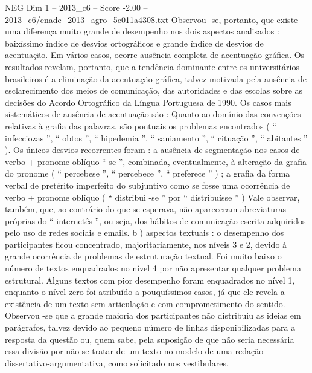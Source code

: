 \begin{textsample}{NEG Dim 1 – 2013\_c6 – Score -2.00 – 2013\_c6/enade\_2013\_agro\_5c011a4308.txt}
Observou -se, portanto, que existe uma diferença muito grande de desempenho nos dois aspectos analisados : baixíssimo índice de desvios ortográficos e grande índice de desvios de acentuação.
Em vários casos, ocorre ausência completa de acentuação gráfica.
Os resultados revelam, portanto, que a tendência dominante entre os universitários brasileiros é a eliminação da acentuação gráfica, talvez motivada pela ausência de esclarecimento dos meios de comunicação, das autoridades e das escolas sobre as decisões do Acordo Ortográfico da Língua Portuguesa de 1990.
Os casos mais sistemáticos de ausência de acentuação são : Quanto ao domínio das convenções relativas à grafia das palavras, são pontuais os problemas encontrados ( “ infecciozas ”, “ obtos ”, “ hipedemia ”, “ saniamento ”, “ cituação ”, “ abitantes ” ).
Os únicos desvios recorrentes foram : a ausência de segmentação nos casos de verbo + pronome oblíquo “ se ”, combinada, eventualmente, à alteração da grafia do pronome ( “ percebese ”, “ percebece ”, “ preferece ” ) ; a grafia da forma verbal de pretérito imperfeito do subjuntivo como se fosse uma ocorrência de verbo + pronome oblíquo ( “ distribui -se ” por “ distribuísse ” ) Vale observar, também, que, ao contrário do que se esperava, não apareceram abreviaturas próprias do “ internetês ”, ou seja, dos hábitos de comunicação escrita adquiridos pelo uso de redes sociais e emails. b ) aspectos textuais : o desempenho dos participantes ficou concentrado, majoritariamente, nos níveis 3 e 2, devido à grande ocorrência de problemas de estruturação textual.
Foi muito baixo o número de textos enquadrados no nível 4 por não apresentar qualquer problema estrutural.
Alguns textos com pior desempenho foram enquadrados no nível 1, enquanto o nível zero foi atribuído a pouquíssimos casos, já que ele revela a existência de um texto sem articulação e com comprometimento do sentido.
Observou -se que a grande maioria dos participantes não distribuiu as ideias em parágrafos, talvez devido ao pequeno número de linhas disponibilizadas para a resposta da questão ou, quem sabe, pela suposição de que não seria necessária essa divisão por não se tratar de um texto no modelo de uma redação dissertativo-argumentativa, como solicitado nos vestibulares.

\end{textsample}
